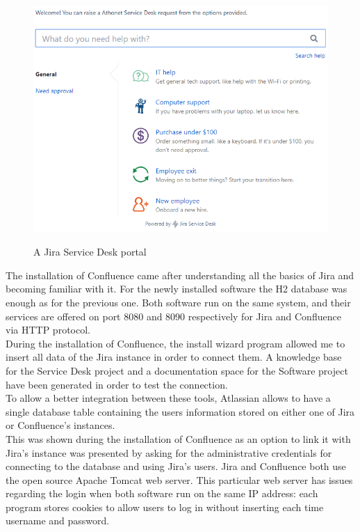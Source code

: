 	\begin{figure}[H]
		\centering
		\includegraphics[width=\textwidth]{resources/Annotation2019-07-24170249}\\
		\caption{A Jira Service Desk portal}
	\end{figure}
	The installation of Confluence came after understanding all the basics of Jira and becoming familiar with it.
	For the newly installed software the H2 database was enough as for the previous one.
	Both software run on the same system, and their services are offered on port 8080 and 8090 respectively for Jira and Confluence via HTTP protocol.\\
	During the installation of Confluence, the install wizard program allowed me to insert all data of the Jira instance in order to connect them.
	A knowledge base for the Service Desk project and a documentation space for the Software project have been generated in order to test the connection.\\
	To allow a better integration between these tools, Atlassian allows to have a single database table containing the users information stored on either one of Jira or Confluence's instances.\\
	This was shown during the installation of Confluence as an option to link it with Jira's instance was presented by asking for the administrative credentials for connecting to the database and using Jira's users.
	Jira and Confluence both use the open source Apache Tomcat web server.
	This particular web server has issues regarding the login when both software run on the same IP address: each program stores \gls{cookies} to allow users to log in without inserting each time username and password.
